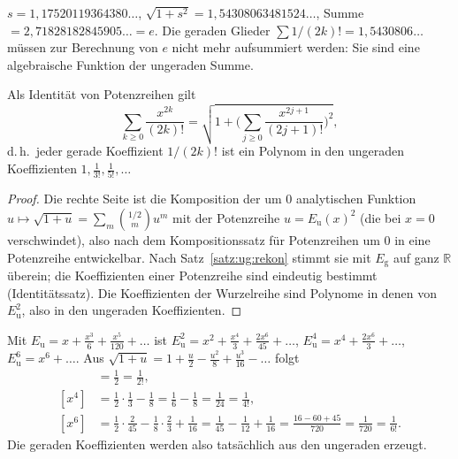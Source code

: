 \begin{bemerkung}[Zahlenwert]
$s=1{,}17520119364380\ldots$, $\sqrt{1+s^2}=1{,}54308063481524\ldots$, Summe $=2{,}71828182845905\ldots=e$. Die geraden Glieder $\sum 1/(2k)!=1{,}5430806\ldots$ müssen zur Berechnung von $e$ nicht mehr aufsummiert werden: Sie sind eine algebraische Funktion der ungeraden Summe.
\end{bemerkung}

\begin{korollar}\label{kor:ug:koeff}
Als Identität von Potenzreihen gilt
\[
\sum_{k\ge0}\frac{x^{2k}}{(2k)!}=\sqrt{1+\Big(\sum_{j\ge0}\frac{x^{2j+1}}{(2j+1)!}\Big)^{2}} ,
\]
d.\,h.\ jeder gerade Koeffizient $1/(2k)!$ ist ein Polynom in den ungeraden Koeffizienten $1,\tfrac1{3!},\tfrac1{5!},\dots$
\end{korollar}

\begin{proof}
Die rechte Seite ist die Komposition der um $0$ analytischen Funktion $u\mapsto\sqrt{1+u}=\sum_m\binom{1/2}{m}u^m$ mit der Potenzreihe $u=E_{\mathrm u}(x)^2$ (die bei $x=0$ verschwindet), also nach dem Kompositionssatz für Potenzreihen um $0$ in eine Potenzreihe entwickelbar. Nach Satz~\ref{satz:ug:rekon} stimmt sie mit $E_{\mathrm g}$ auf ganz $\mathbb{R}$ überein; die Koeffizienten einer Potenzreihe sind eindeutig bestimmt (Identitätssatz). Die Koeffizienten der Wurzelreihe sind Polynome in denen von $E_{\mathrm u}^2$, also in den ungeraden Koeffizienten.
\end{proof}

\begin{beispiel}
Mit $E_{\mathrm u}=x+\frac{x^3}{6}+\frac{x^5}{120}+\dots$ ist $E_{\mathrm u}^2=x^2+\frac{x^4}{3}+\frac{2x^6}{45}+\dots$, $E_{\mathrm u}^4=x^4+\frac{2x^6}{3}+\dots$, $E_{\mathrm u}^6=x^6+\dots$. Aus $\sqrt{1+u}=1+\frac u2-\frac{u^2}{8}+\frac{u^3}{16}-\dots$ folgt
\begin{align*}
[x^2]&=\tfrac12=\tfrac1{2!},\\
[x^4]&=\tfrac12\cdot\tfrac13-\tfrac18=\tfrac16-\tfrac18=\tfrac1{24}=\tfrac1{4!},\\
[x^6]&=\tfrac12\cdot\tfrac2{45}-\tfrac18\cdot\tfrac23+\tfrac1{16}=\tfrac1{45}-\tfrac1{12}+\tfrac1{16}=\tfrac{16-60+45}{720}=\tfrac1{720}=\tfrac1{6!}.
\end{align*}
Die geraden Koeffizienten werden also tatsächlich aus den ungeraden erzeugt.
\end{beispiel}

